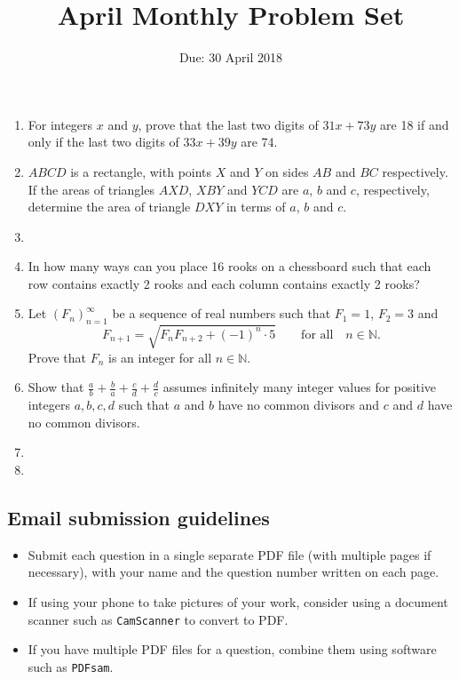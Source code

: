 \documentclass[12pt]{article}
\title{\vspace{-12pt}April Monthly Problem Set}
\author{Due: 30 April 2018}
\date{}
\begin{document}
 \maketitle \pagestyle{empty}

\begin{enumerate}

\item %
For integers $x$ and $y$, prove that the last two digits of $31x+73y$ are 18 if and only if the last two digits of $33x+39y$ are 74.


\item %
$ABCD$ is a rectangle, with points $X$ and $Y$ on sides $AB$ and $BC$ respectively. If the areas of triangles $AXD$, $XBY$ and $YCD$ are $a$, $b$ and $c$, respectively, determine the area of triangle $DXY$ in terms of $a$, $b$ and $c$.


\item %


\item %
In how many ways can you place 16 rooks on a chessboard such that each row contains exactly 2 rooks and each column contains exactly 2 rooks?


\item %
Let $(F_n)_{n=1}^\infty$ be a sequence of real numbers such that $F_1 = 1$, $F_2 = 3$ and \[F_{n+1} = \sqrt{F_{n}F_{n+2} +(-1)^n \cdot 5} \qquad \textrm{for all}\quad n\in\mathbb{N}.\] Prove that $F_n$ is an integer for all $n\in\mathbb{N}$.


\item %
Show that $\displaystyle \frac{a}{b} +\frac{b}{a} +\frac{c}{d} +\frac{d}{c}$ assumes infinitely many integer values for positive integers $a,b,c,d$ such that $a$ and $b$ have no common divisors and $c$ and $d$ have no common divisors.


\item %


\item %

\end{enumerate}


\subsection*{Email submission guidelines}

\begin{itemize}
\item Submit each question in a single separate PDF file (with multiple pages if necessary), with your name and the question number written on each page.
\item If using your phone to take pictures of your work, consider using a document scanner such as \verb!CamScanner! to convert to PDF.
\item If you have multiple PDF files for a question, combine them using software such as \verb!PDFsam!.
\end{itemize}
\end{document}
